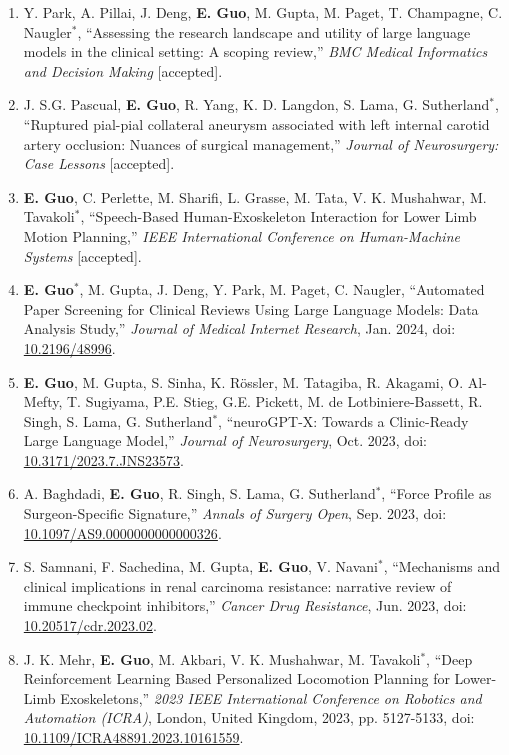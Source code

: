 \documentclass{article}
\begin{document}
\begin{enumerate}
    \item Y. Park, A. Pillai, J. Deng, \textbf{E. Guo}, M. Gupta, M. Paget, T. Champagne, C. Naugler$^*$, ``Assessing the research landscape and utility of large language models in the clinical setting: A scoping review,'' \textit{BMC Medical Informatics and Decision Making} [accepted].
    \item J. S.G. Pascual, \textbf{E. Guo}, R. Yang, K. D. Langdon, S. Lama, G. Sutherland$^*$, ``Ruptured pial-pial collateral aneurysm associated with left internal carotid artery occlusion: Nuances of surgical management,'' \textit{Journal of Neurosurgery: Case Lessons} [accepted].
    \item \textbf{E. Guo}, C. Perlette, M. Sharifi, L. Grasse, M. Tata, V. K. Mushahwar, M. Tavakoli$^*$, ``Speech-Based Human-Exoskeleton Interaction for Lower Limb Motion Planning,''  \textit{IEEE International Conference on Human-Machine Systems} [accepted].
    \item \textbf{E. Guo}$^*$, M. Gupta, J. Deng, Y. Park, M. Paget, C. Naugler, ``Automated Paper Screening for Clinical Reviews Using Large Language Models: Data Analysis Study,'' \textit{Journal of Medical Internet Research}, Jan. 2024, doi: \href{https://doi.org/10.2196/48996}{10.2196/48996}.
    \item \textbf{E. Guo}, M. Gupta, S. Sinha, K. R\"ossler, M. Tatagiba, R. Akagami, O. Al-Mefty, T. Sugiyama, P.E. Stieg, G.E. Pickett, M. de Lotbiniere-Bassett, R. Singh, S. Lama, G. Sutherland$^*$, ``neuroGPT-X: Towards a Clinic-Ready Large Language Model,'' \textit{Journal of Neurosurgery}, Oct. 2023, doi: \href{https://doi.org/10.3171/2023.7.JNS23573}{10.3171/2023.7.JNS23573}.
    \item A. Baghdadi, \textbf{E. Guo}, R. Singh, S. Lama, G. Sutherland$^*$, ``Force Profile as Surgeon-Specific Signature,'' \textit{Annals of Surgery Open}, Sep. 2023, doi: \href{https://doi.org/10.1097/AS9.0000000000000326}{10.1097/AS9.0000000000000326}.
    \item S. Samnani, F. Sachedina, M. Gupta, \textbf{E. Guo}, V. Navani$^*$, ``Mechanisms and clinical implications in renal carcinoma resistance: narrative review of immune checkpoint inhibitors,'' \textit{Cancer Drug Resistance}, Jun. 2023, doi: \href{https://doi.org/10.20517/cdr.2023.02 }{10.20517/cdr.2023.02}.
    \item J. K. Mehr, \textbf{E. Guo}, M. Akbari, V. K. Mushahwar, M. Tavakoli$^*$, ``Deep Reinforcement Learning Based Personalized Locomotion Planning for Lower-Limb Exoskeletons,'' \textit{2023 IEEE International Conference on Robotics and Automation (ICRA)}, London, United Kingdom, 2023, pp. 5127-5133, doi: \href{https://doi.org/10.1109/ICRA48891.2023.10161559}{10.1109/ICRA48891.2023.10161559}.

\end{enumerate}
\end{document}
